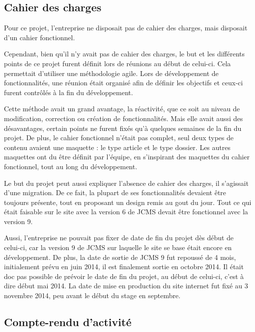 \documentclass[12pt,a4paper]{article}
\begin{document}
\subsection{Cahier des charges}
Pour ce projet, l'entreprise ne disposait pas de cahier des charges, mais disposait d'un cahier fonctionnel.\par
Cependant, bien qu'il n'y avait pas de cahier des charges, le but et les différents points de ce projet furent définit lors de réunions au début de celui-ci. Cela permettait d'utiliser une méthodologie agile. Lors de développement de fonctionnalités, une réunion était organisé afin de définir les objectifs et ceux-ci furent contrôlés à la fin du développement.\par 
Cette méthode avait un grand avantage, la réactivité, que ce soit au niveau de modification, correction ou création de fonctionnalités. Mais elle avait aussi des désavantages, certain points ne furent fixés qu'à quelques semaines de la fin du projet. De plus, le cahier fonctionnel n'était pas complet, seul deux types de contenu avaient une maquette : le type article et le type dossier. Les autres maquettes ont du être définit par l'équipe, en s'inspirant des maquettes du cahier fonctionnel, tout au long du développement. \par 
Le but du projet peut aussi expliquer l'absence de cahier des charges, il s'agissait d'une migration. De ce fait, la plupart de ses fonctionnalités devaient être toujours présente, tout en proposant un design remis au gout du jour. Tout ce qui était faisable sur le site avec la version 6 de \gls{JCMS} devait être fonctionnel avec la version 9.\par 
Aussi, l'entreprise ne pouvait pas fixer de date de fin du projet dès début de celui-ci, car la version 9 de \gls{JCMS} sur laquelle le site se base était encore en développement. De plus, la date de sortie de \gls{JCMS} 9 fut repoussé de 4 mois, initialement prévu en juin 2014, il est finalement sortie en octobre 2014. Il était doc pas possible de prévoir le date de fin du projet, au début de celui-ci, c'est à dire début mai 2014. La date de mise en production du site internet fut fixé au 3 novembre 2014, peu avant le début du stage en septembre.\par
\subsection{Compte-rendu d'activité}
\end{document}
